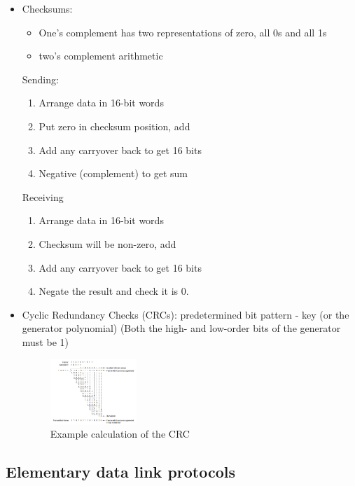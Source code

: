 \begin{itemize}
\begin{itemize}
    \end{itemize}
    \item Checksums: {\small
    \begin{itemize}
        \item One's complement has two representations of zero, all 0s and all 1s
        \item two's complement arithmetic
    \end{itemize}
    \subitem Sending:
    \begin{enumerate}
        \item Arrange data in 16-bit words
        \item Put zero in checksum position, add
        \item Add any carryover back to get 16 bits
        \item Negative (complement) to get sum
    \end{enumerate}
    \subitem Receiving
    \begin{enumerate}
        \item Arrange data in 16-bit words
        \item Checksum will be non-zero, add
        \item Add any carryover back to get 16 bits
        \item Negate the result and check it is 0.
    \end{enumerate} }
    \item Cyclic Redundancy Checks (CRCs): predetermined bit pattern - key (or the generator polynomial) (Both the high- and low-order bits of the generator must be 1)
    \begin{figure}[!htb]
        \centering
        \includegraphics[width=0.309\textwidth]{pic/CN3/CRC.png}
        \caption{Example calculation of the CRC}
    \end{figure}
    
\end{itemize}


\subsection{Elementary data link protocols}
